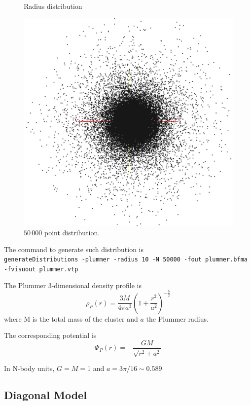 \documentclass[10pt]{article}
\begin{document}
\begin{figure}[h]
\begin{minipage}{0.45\textwidth}
    \caption{Radius distribution}%
  \end{minipage}%
   \qquad
  \begin{minipage}{0.45\textwidth}%
   \includegraphics[width=1.0\textwidth]{plummer3D}
    \caption{$50\,000$ point distribution.}%
      \end{minipage}%

\end{figure}

The command to generate such distribution is\\
\texttt{generateDistributions -plummer -radius 10 -N 50000 -fout plummer.bfma  -fvisuout plummer.vtp 
} 



The Plummer 3-dimensional density profile is 
\begin{equation}
\rho_P(r) = \frac{3 M}{4\pi a^3} (1+\frac{r^2}{a^2})^{-\frac{5}{2}}
\end{equation}
where M is the total mass of the cluster and $a$ the Plummer radius. 

The corresponding potential is 
\begin{equation}
\Phi_P(r) = - \frac{G M}{\sqrt{r^2+a^2}}
\end{equation}

In N-body units, $G = M = 1$ and $a = 3\pi/16 \sim 0.589$
\subsection{Diagonal Model}
\end{document}
